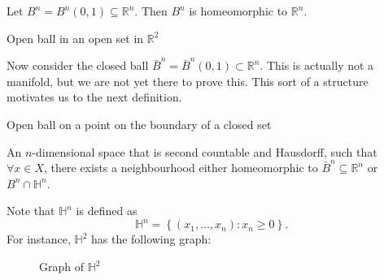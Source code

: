 \documentclass[notoc,notitlepage]{tufte-book}
\begin{document}
\begin{eg}
  Let $B^n = B^n(0, 1) \subseteq \mathbb{R}^n$. Then $B^n$ is homeomorphic to
  $\mathbb{R}^n$.
  \begin{marginfigure}
    \centering
    \caption{Open ball in an open set in $\mathbb{R}^2$}\label{fig:open_ball_in_an_open_set_in_r_2_}
  \end{marginfigure}
\end{eg}

\begin{eg}
  Now consider the closed ball $\bar{B}^n = \bar{B}^n(0, 1) \subset \mathbb{R}^n$. This is
  actually not a manifold, but we are not yet there to prove this. This sort of a structure
  motivates us to the next definition.
  \begin{marginfigure}
    \centering
    \caption{Open ball on a point on the boundary of a closed set}\label{fig:open_ball_on_a_point_on_the_boundary_of_a_closed_set}
  \end{marginfigure}
\end{eg}

\begin{defn}\label{defn:manifold_with_boundary}
  An $n$-dimensional space that is second countable and Hausdorff, such that $\forall x \in X$,
  there exists a neighbourhood either homeomorphic to $\bar{B}^n \subseteq \mathbb{R}^n$ or
  $B^n \cap \mathbb{H}^n$.
\end{defn}

\begin{note}
  Note that $\mathbb{H}^n$ is defined as
  \begin{equation*}
    \mathbb{H}^n = \left\{ ( x_1, \ldots, x_n ) : x_n \geq 0 \right\}.
  \end{equation*}
  For instance, $\mathbb{H}^2$ has the following graph:
  \begin{figure}[ht]
    \centering
    \caption{Graph of $\mathbb{H}^2$}
    \label{fig:graph_of_h_2}
  \end{figure}
\end{note}
\end{document}
